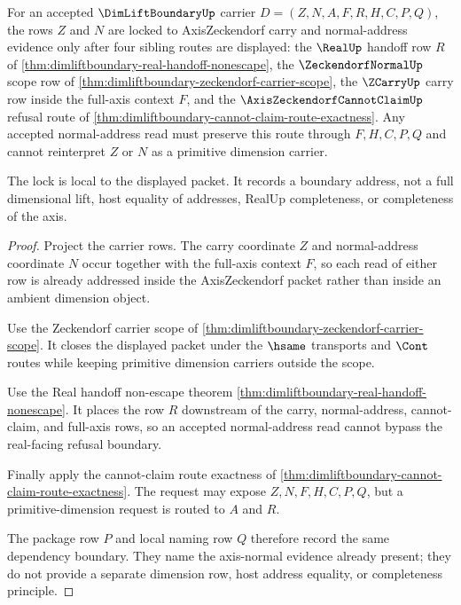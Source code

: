 \begin{theorem}
\label{thm:dimliftboundary-axis-normal-address-lock}
For an accepted $\DimLiftBoundaryUp$ carrier $D=(Z,N,A,F,R,H,C,P,Q)$, the rows $Z$ and $N$ are locked to AxisZeckendorf carry and normal-address evidence only after four sibling routes are displayed: the $\RealUp$ handoff row $R$ of \autoref{thm:dimliftboundary-real-handoff-nonescape}, the $\ZeckendorfNormalUp$ scope row of \autoref{thm:dimliftboundary-zeckendorf-carrier-scope}, the $\ZCarryUp$ carry row inside the full-axis context $F$, and the $\AxisZeckendorfCannotClaimUp$ refusal route of \autoref{thm:dimliftboundary-cannot-claim-route-exactness}. Any accepted normal-address read must preserve this route through $F,H,C,P,Q$ and cannot reinterpret $Z$ or $N$ as a primitive dimension carrier.

The lock is local to the displayed packet. It records a boundary address, not a full dimensional lift, host equality of addresses, RealUp completeness, or completeness of the axis.
\end{theorem}
\begin{proof}
Project the carrier rows. The carry coordinate $Z$ and normal-address coordinate $N$ occur together with the full-axis context $F$, so each read of either row is already addressed inside the AxisZeckendorf packet rather than inside an ambient dimension object.

Use the Zeckendorf carrier scope of \autoref{thm:dimliftboundary-zeckendorf-carrier-scope}. It closes the displayed packet under the $\hsame$ transports and $\Cont$ routes while keeping primitive dimension carriers outside the scope.

Use the Real handoff non-escape theorem \autoref{thm:dimliftboundary-real-handoff-nonescape}. It places the row $R$ downstream of the carry, normal-address, cannot-claim, and full-axis rows, so an accepted normal-address read cannot bypass the real-facing refusal boundary.

Finally apply the cannot-claim route exactness of \autoref{thm:dimliftboundary-cannot-claim-route-exactness}. The request may expose $Z,N,F,H,C,P,Q$, but a primitive-dimension request is routed to $A$ and $R$.

The package row $P$ and local naming row $Q$ therefore record the same dependency boundary. They name the axis-normal evidence already present; they do not provide a separate dimension row, host address equality, or completeness principle.
\end{proof}

